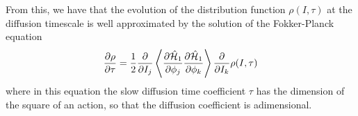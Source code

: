 

From this, we have that the evolution of the distribution function \(\rho(I,\tau)\) at the diffusion timescale is well approximated by the solution of the Fokker-Planck equation
\begin{equation}
	\pdv{\rho}{\tau}=\frac{1}{2}\pdv{}{I_j}\left\langle\pdv{\hat{\mathcal{H}}_1}{\phi_j}\pdv{\hat{\mathcal{H}}_1}{\phi_k}\right\rangle\pdv{}{I_k}\rho(I,\tau)
\end{equation}
where in this equation the slow diffusion time coefficient \(\tau\) has the dimension of the square of an action, so that the diffusion coefficient is adimensional.


